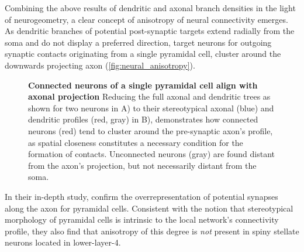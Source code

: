 Combining the above results of dendritic and axonal branch densities
in the light of neurogeometry, a clear concept of anisotropy of neural
connectivity emerges. As dendritic branches of potential post-synaptic
targets extend radially from the soma and do not display a preferred
direction, target neurons for outgoing synaptic contacts originating
from a single pyramidal cell, cluster around the downwards projecting
axon (\autoref{fig:neural_anisotropy}).
\begin{figure}[!ht]
  \centering 

    \caption{%
      \textbf{Connected neurons of a single pyramidal cell align with
        axonal projection} Reducing the full axonal and dendritic
      trees as shown for two neurons in A)  to their stereotypical
      axonal (blue) and dendritic profiles (red, gray) in B), demonstrates
      how connected neurons (red) tend to cluster around the
      pre-synaptic axon's profile, as spatial closeness constitutes a
      necessary condition for the formation of contacts. Unconnected
      neurons (gray) are found distant from the axon's projection, but
      not necessarily distant from the soma. }
  \label{fig:neural_anisotropy}
\end{figure}
In their in-depth study, \textcite{Stepanyants2005} confirm the
overrepresentation of potential synapses along the axon for pyramidal
cells. Consistent with the notion that stereotypical morphology of
pyramidal cells is intrinsic to the local network's connectivity
profile, they also find that anisotropy of this degree is \textit{not}
present in spiny stellate neurons located in lower-layer-4.





